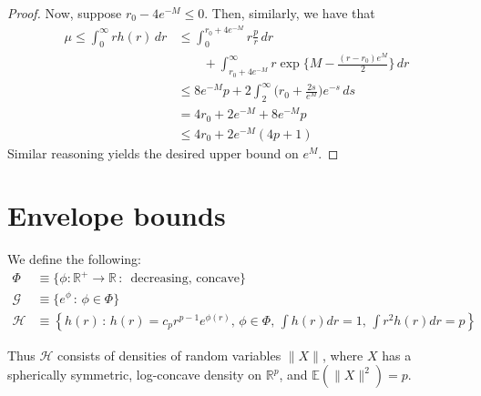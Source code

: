 \documentclass[12pt]{article}
\begin{document}
\begin{proof}
Now, suppose $r_0 - 4e^{-M} \leq 0$. Then, similarly, we have that
\begin{align*}
\mu \leq \int_0^\infty r h(r) \, dr &\leq  \int_0^{r_0 + 4e^{-M}} r \frac{p}{r} \, dr \\
&\qquad + \int_{r_0 + 4e^{-M}}^\infty r \exp\biggl\{M - \frac{(r-r_0)e^M}{2}\biggr\} \, dr \\
                                    &\leq 8e^{-M} p + 2\int_2^\infty \biggl(r_0 + \frac{2s}{e^M}\biggr) e^{-s} \, ds \\
                                    & = 4 r_0 + 2e^{-M} + 8 e^{-M} p \\
  &\leq 4r_0 + 2 e^{-M}(4p+1)
\end{align*}
Similar reasoning yields the desired upper bound on $e^{M}$.
  
\end{proof}



\section{Envelope bounds}

We define the following:
\begin{align}
  \Phi &\equiv \{ \phi: \mathbb{R}^+ \rightarrow \mathbb{R} \,:\, \textrm{ decreasing, concave} \} \label{defn:Phi} \\
  \mathcal{G} &\equiv \{ e^{\phi} \,:\, \phi \in \Phi \}\\
  \mathcal{H} &\equiv \left\{ h(r) \,:\, h(r) = c_p r^{p-1} e^{\phi(r)}, \, \phi \in \Phi,\, \int h(r) dr = 1,\, \int r^2 h(r) dr = p \right\}
                 \label{defn:H_second_moment}
\end{align}

Thus $\mathcal{H}$ consists of densities of random variables $\|X\|$, where $X$ has a spherically symmetric, log-concave density on $\mathbb{R}^p$, and $\mathbb{E}(\|X\|^2) = p$.
\end{document}
